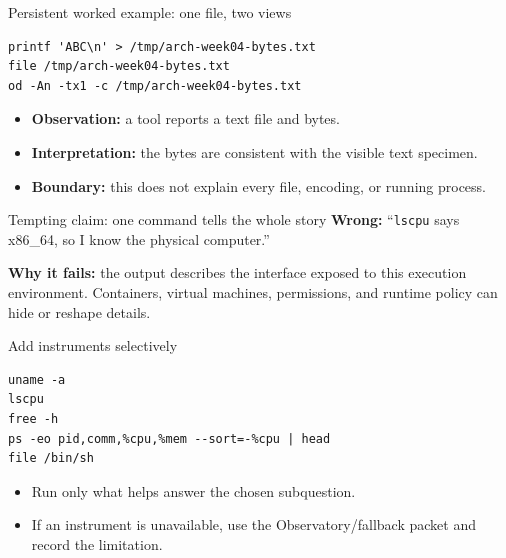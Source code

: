 \documentclass{beamer}
\begin{document}
\begin{frame}[fragile]{Persistent worked example: one file, two views}
\begin{lstlisting}
printf 'ABC\n' > /tmp/arch-week04-bytes.txt
file /tmp/arch-week04-bytes.txt
od -An -tx1 -c /tmp/arch-week04-bytes.txt
\end{lstlisting}
\begin{itemize}
  \item \textbf{Observation:} a tool reports a text file and bytes.
  \item \textbf{Interpretation:} the bytes are consistent with the visible text specimen.
  \item \textbf{Boundary:} this does not explain every file, encoding, or running process.
\end{itemize}
\end{frame}

\begin{frame}{Tempting claim: one command tells the whole story}
\Large
\textbf{Wrong:} ``\texttt{lscpu} says x86\_64, so I know the physical computer.''

\vspace{1em}
\normalsize
\textbf{Why it fails:} the output describes the interface exposed to this execution environment. Containers, virtual machines, permissions, and runtime policy can hide or reshape details.
\end{frame}

\begin{frame}[fragile]{Add instruments selectively}
\begin{lstlisting}
uname -a
lscpu
free -h
ps -eo pid,comm,%cpu,%mem --sort=-%cpu | head
file /bin/sh
\end{lstlisting}
\begin{itemize}
  \item Run only what helps answer the chosen subquestion.
  \item If an instrument is unavailable, use the Observatory/fallback packet and record the limitation.
\end{itemize}
\end{frame}
\end{document}

